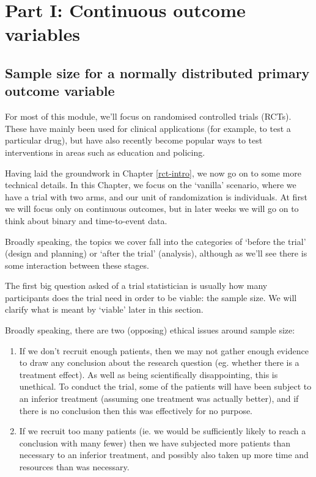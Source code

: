 \documentclass[
  openany]{book}
\providecommand{\tightlist}{%
  \setlength{\itemsep}{0pt}\setlength{\parskip}{0pt}}
\theoremstyle{definition}
\theoremstyle{definition}
\theoremstyle{definition}
\theoremstyle{definition}
\theoremstyle{remark}
\begin{document}
\hypertarget{part-part-i-continuous-outcome-variables}{%
\part{Part I: Continuous outcome variables}\label{part-part-i-continuous-outcome-variables}}

\hypertarget{rct-plan}{%
\chapter{Sample size for a normally distributed primary outcome variable}\label{rct-plan}}

For most of this module, we'll focus on randomised controlled trials (RCTs). These have mainly been used for clinical applications (for example, to test a particular drug), but have also recently become popular ways to test interventions in areas such as education and policing.

Having laid the groundwork in Chapter \ref{rct-intro}, we now go on to some more technical details. In this Chapter, we focus on the `vanilla' scenario, where we have a trial with two arms, and our unit of randomization is individuals. At first we will focus only on continuous outcomes, but in later weeks we will go on to think about binary and time-to-event data.

Broadly speaking, the topics we cover fall into the categories of `before the trial' (design and planning) or `after the trial' (analysis), although as we'll see there is some interaction between these stages.

The first big question asked of a trial statistician is usually how many participants does the trial need in order to be viable: the sample size. We will clarify what is meant by `viable' later in this section.

Broadly speaking, there are two (opposing) ethical issues around sample size:

\begin{enumerate}
\def\labelenumi{\arabic{enumi}.}
\tightlist
\item
  If we don't recruit enough patients, then we may not gather enough evidence to draw any conclusion about the research question (eg. whether there is a treatment effect). As well as being scientifically disappointing, this is unethical. To conduct the trial, some of the patients will have been subject to an inferior treatment (assuming one treatment was actually better), and if there is no conclusion then this was effectively for no purpose.
\item
  If we recruit too many patients (ie. we would be sufficiently likely to reach a conclusion with many fewer) then we have subjected more patients than necessary to an inferior treatment, and possibly also taken up more time and resources than was necessary.
\end{enumerate}
\end{document}

